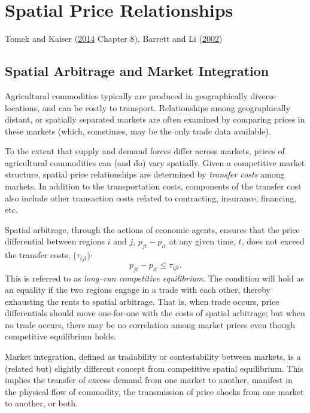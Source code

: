 \documentclass[]{book}
\begin{document}
\chapter{Spatial Price Relationships}\label{spatial-price-relationships}

Tomek and Kaiser (\protect\hyperlink{ref-tomek2014}{2014} Chapter 8),
Barrett and Li (\protect\hyperlink{ref-barrett2002}{2002})

\section{Spatial Arbitrage and Market
Integration}\label{spatial-arbitrage-and-market-integration}

Agricultural commodities typically are produced in geographically
diverse locations, and can be costly to transport. Relationships among
geographically distant, or spatially separated markets are often
examined by comparing prices in these markets (which, sometimes, may be
the only trade data available).

To the extent that supply and demand forces differ across markets,
prices of agricultural commodities can (and do) vary spatially. Given a
competitive market structure, spatial price relationships are determined
by \emph{transfer costs} among markets. In addition to the
transportation costs, components of the transfer cost also include other
transaction costs related to contracting, insurance, financing, etc.

Spatial arbitrage, through the actions of economic agents, ensures that
the price differential between regions \(i\) and \(j\),
\(p_{jt}-p_{it}\) at any given time, \(t\), does not exceed the transfer
costs, (\(\tau_{ijt}\)): \[p_{jt}-p_{it} \le \tau_{ijt}.\] This is
referred to as \emph{long--run competitive equilibrium}. The condition
will hold as an equality if the two regions engage in a trade with each
other, thereby exhausting the rents to spatial arbitrage. That is, when
trade occurs, price differentials should move one-for-one with the costs
of spatial arbitrage; but when no trade occurs, there may be no
correlation among market prices even though competitive equilibrium
holds.

Market integration, defined as tradability or contestability between
markets, is a (related but) slightly different concept from competitive
spatial equilibrium. This implies the transfer of excess demand from one
market to another, manifest in the physical flow of commodity, the
transmission of price shocks from one market to another, or both.
\end{document}
